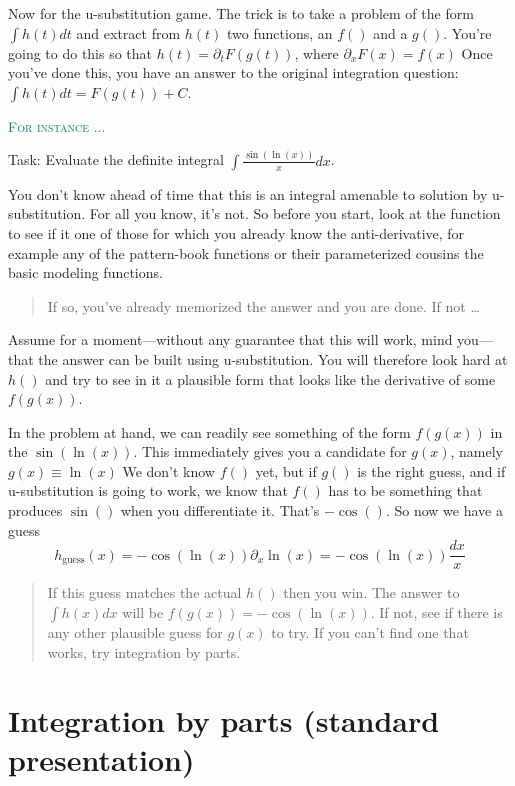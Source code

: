 \documentclass[
  letterpaper,
  DIV=11,
  numbers=noendperiod,
  oneside]{scrreprt}
\newenvironment{example}%
{%
\textcolor{teal}{\hrulefill}%
  \par\vspace{.3\baselineskip}%
  \textcolor{teal}{\scshape For instance ...}%
  \par\vspace{\baselineskip}%
}%
{\textcolor{teal}{\hrulefill}}
\begin{document}
Now for the u-substitution game. The trick is to take a problem of the
form \(\int h(t) dt\) and extract from \(h(t)\) two functions, an
\(f()\) and a \(g()\). You're going to do this so that
\(h(t) = \partial_t F(g(t))\), where \(\partial_x F(x) = f(x)\) Once
you've done this, you have an answer to the original integration
question: \(\int h(t) dt = F(g(t)) + C\).

\begin{example}

Task: Evaluate the definite integral \(\int \frac{\sin(\ln(x))}{x} dx\).

You don't know ahead of time that this is an integral amenable to
solution by u-substitution. For all you know, it's not. So before you
start, look at the function to see if it one of those for which you
already know the anti-derivative, for example any of the pattern-book
functions or their parameterized cousins the basic modeling functions.

\begin{quote}
If so, you've already memorized the answer and you are done. If not
\ldots{}
\end{quote}

Assume for a moment---without any guarantee that this will work, mind
you---that the answer can be built using u-substitution. You will
therefore look hard at \(h()\) and try to see in it a plausible form
that looks like the derivative of some \(f(g(x))\).

In the problem at hand, we can readily see something of the form
\(f(g(x))\) in the \(\sin(\ln(x))\). This immediately gives you a
candidate for \(g(x)\), namely \(g(x)\equiv \ln(x)\) We don't know
\(f()\) yet, but if \(g()\) is the right guess, and if u-substitution is
going to work, we know that \(f()\) has to be something that produces
\(\sin()\) when you differentiate it. That's \(-\cos()\). So now we have
a guess
\[h_\text{guess}(x) = -\cos(\ln(x)) \partial_x \ln(x) = - \cos(\ln(x)) \frac{dx}{x}\]

\begin{quote}
If this guess matches the actual \(h()\) then you win. The answer to
\(\int h(x) dx\) will be \(f(g(x)) = -\cos(\ln(x))\). If not, see if
there is any other plausible guess for \(g(x)\) to try. If you can't
find one that works, try integration by parts.
\end{quote}

\end{example}

\hypertarget{integration-by-parts-standard-presentation}{%
\section{Integration by parts (standard
presentation)}\label{integration-by-parts-standard-presentation}}
\end{document}

